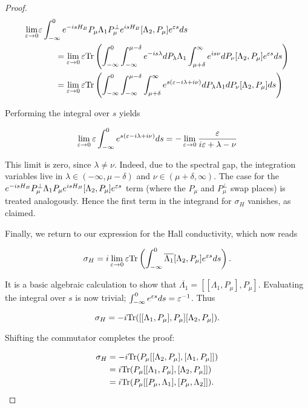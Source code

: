 \documentclass[12pt, letterpaper]{article}
\begin{document}
\begin{proof}
\[\begin{aligned} 
\lim_{\varepsilon\to 0} &\varepsilon \int_{-\infty}^0 e^{-isH_B}P_\mu \Lambda_1 P_\mu^\perp e^{isH_B}[\Lambda_2, P_\mu]e^{\varepsilon s} ds \\
&\quad\quad= \lim_{\varepsilon\to 0} \varepsilon \text{Tr}\left( \int_{-\infty}^0 \int_{-\infty}^{\mu-\delta} e^{-is\lambda}dP_\lambda \Lambda_1 \int_{\mu+\delta}^\infty e^{is\nu} dP_\nu [\Lambda_2, P_\mu] e^{\varepsilon s} ds\right)\\
&\quad\quad= \lim_{\varepsilon\to 0} \varepsilon \text{Tr}\left( \int_{-\infty}^0 \int_{-\infty}^{\mu-\delta} \int_{\mu+\delta}^\infty e^{s(\varepsilon-i\lambda+i\nu)}dP_\lambda \Lambda_1 dP_\nu [\Lambda_2, P_\mu]ds\right)\\
\end{aligned}\]

Performing the integral over $s$ yields

\[\lim_{\varepsilon\to 0}\varepsilon \int_{-\infty}^0 e^{s(\varepsilon-i\lambda+i\nu)}ds = -\lim_{\varepsilon\to 0} \frac{\varepsilon}{i\varepsilon + \lambda-\nu}\]

This limit is zero, since $\lambda \neq \nu$. Indeed, due to the spectral gap, the integration variables live in $\lambda \in (-\infty, \mu-\delta)$ and $\nu \in (\mu+\delta,\infty)$. The case for the $e^{-isH_B}P_\mu^\perp \Lambda_1 P_\mu e^{isH_B}[\Lambda_2, P_\mu]e^{\varepsilon s}$ term (where the $P_\mu$ and $P_\mu^\perp$ swap places) is treated analogously. Hence the first term in the integrand for $\sigma_H$ vanishes, as claimed. 

Finally, we return to our expression for the Hall conductivity, which now reads

\[\sigma_H = i\lim_{\varepsilon\to 0}\varepsilon \text{Tr}\left(\int_{-\infty}^0 \overline{\Lambda_1}[\Lambda_2, P_\mu]e^{\varepsilon s}ds\right).\]

It is a basic algebraic calculation to show that $\overline{\Lambda_1} = [[\Lambda_1, P_\mu],P_\mu]$. Evaluating the integral over $s$ is now trivial; $\int_{-\infty}^0 e^{\varepsilon s}ds = \varepsilon^{-1}$. Thus

\[\sigma_H = -i\text{Tr}([[\Lambda_1,P_\mu],P_\mu][\Lambda_2,P_\mu]).\]

Shifting the commutator completes the proof:

\[\begin{aligned}
\sigma_H &= -i\text{Tr}(P_\mu[[\Lambda_2,P_\mu],[\Lambda_1,P_\mu]]) \\
&= i\text{Tr}(P_\mu[[\Lambda_1,P_\mu],[\Lambda_2,P_\mu]])\\
&= i\text{Tr}(P_\mu[[P_\mu,\Lambda_1],[P_\mu,\Lambda_2]]).
\end{aligned}\]

\end{proof}
\end{document}
